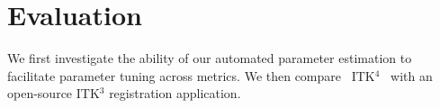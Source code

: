 \documentclass{llncs}
\newcommand{\vect}[1]{\mathbf{#1}}
\renewcommand{\u}{\vect{u}}
\renewcommand{\v}{\vect{v}}
\newcommand{\tk}{~ITK$^{\text{4}}$~}
\begin{document}

\section{Evaluation}
We first investigate the ability of our automated parameter estimation
to facilitate parameter tuning across metrics.  We then compare \tk
with an open-source ITK$^3$ registration application.
\end{document}
